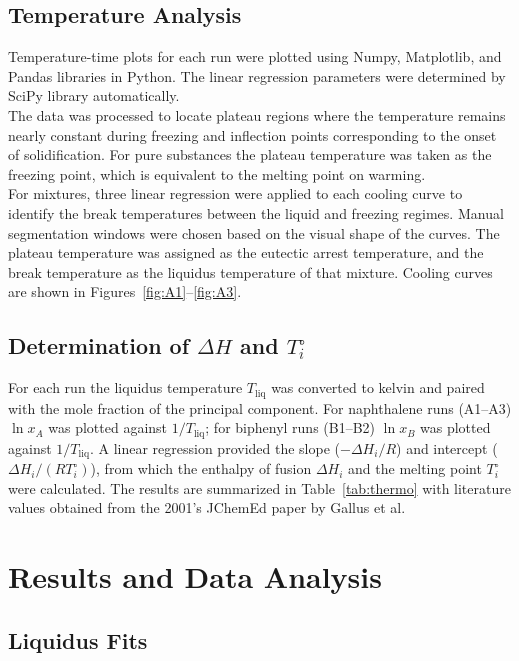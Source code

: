\documentclass[12pt]{article}
\begin{document}
\subsection*{Temperature Analysis}
Temperature-time plots for each run were plotted using Numpy\cite{harris2020array}, Matplotlib\cite{Hunter2007}, and Pandas\cite{reback2020pandas} libraries in Python. The linear regression parameters were determined by SciPy\cite{2020SciPy} library automatically. 
\\
The data was processed to locate plateau regions where the temperature remains nearly constant during freezing and inflection points corresponding to the onset of solidification. For pure substances the plateau temperature was taken as the freezing point, which is equivalent to the melting point on warming. 
\\
For mixtures, three linear regression were applied to each cooling curve to identify the break temperatures between the liquid and freezing regimes. Manual segmentation windows were chosen based on the visual shape of the curves. The plateau temperature was assigned as the eutectic arrest temperature, and the break temperature as the liquidus temperature of that mixture. Cooling curves are shown in Figures~\ref{fig:A1}–\ref{fig:A3}.



\subsection*{Determination of $\Delta H$ and $T_i^{\circ}$}

For each run the liquidus temperature $T_{\mathrm{liq}}$ was converted to kelvin and paired with the mole fraction of the principal component.  For naphthalene runs (A1–A3) $\ln x_A$ was plotted against $1/T_{\mathrm{liq}}$; for biphenyl runs (B1–B2) $\ln x_B$ was plotted against $1/T_{\mathrm{liq}}$.  A linear regression provided the slope ($-\Delta H_i/R$) and intercept ($\Delta H_i/(R T_i^{\circ})$), from which the enthalpy of fusion $\Delta H_i$ and the melting point $T_i^{\circ}$ were calculated.  The results are summarized in Table~\ref{tab:thermo} with literature values obtained from the 2001's JChemEd paper by Gallus et al.\cite{gallus2001binary}

\section*{Results and Data Analysis}

\subsection*{Liquidus Fits}
\end{document}
